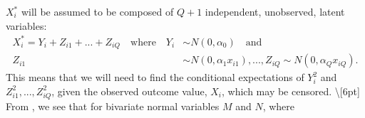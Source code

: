 \documentclass[
]{jss}
\begin{document}
\(X_i^*\) will be assumed to be composed of \(Q+1\) independent,
unobserved, latent variables: \begin{align}
X_i^* =Y_i+Z_{i1}+...+Z_{iQ} \quad \textrm{where}  \quad
Y_i &\sim N(0, \alpha_0) \quad \textrm{and}  \nonumber \\
Z_{i1} &\sim N(0,  \alpha_1x_{i1})  ,..., Z_{iQ} \sim N(0,  \alpha_Qx_{iQ}). \label{censored_latents}
\end{align} This means that we will need to find the conditional
expectations of \(Y_i^2\) and \(Z_{i1}^2, ..., Z_{iQ}^2\), given the
observed outcome value, \(X_i\), which may be censored.
\textbackslash{[}6pt{]} From \citep{Aitkin1964}, we see that for
bivariate normal variables \(M\) and \(N\), where


\end{document}
